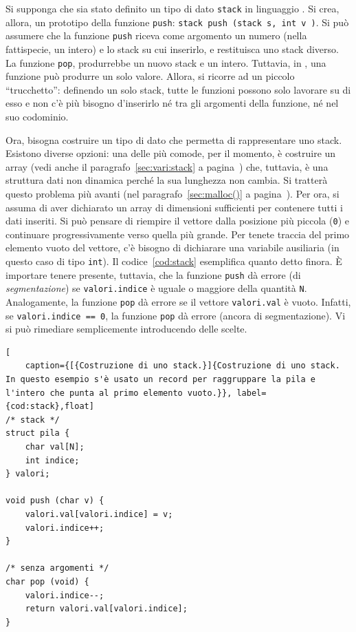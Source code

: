 Si supponga che sia stato definito un tipo di dato \lstinline!stack! in linguaggio .
Si crea, allora, un prototipo della funzione \lstinline!push!: \lstinline!stack push (stack s, int v )!.
Si può assumere che la funzione \lstinline!push! riceva come argomento un numero (nella fattispecie, un intero) e lo stack su cui inserirlo, e restituisca uno stack diverso.
La funzione \lstinline!pop!, produrrebbe un nuovo stack e un intero.
Tuttavia, in , una funzione può produrre un solo valore.
Allora, si ricorre ad un piccolo ``trucchetto'': definendo un solo stack, tutte le funzioni possono solo lavorare su di esso e non c'è più bisogno d'inserirlo né tra gli argomenti della funzione, né nel suo codominio.

Ora, bisogna costruire un tipo di dato che permetta di rappresentare uno stack.
Esistono diverse opzioni: una delle più comode, per il momento, è costruire un array (vedi anche il paragrafo~\ref{sec:vari:stack} a pagina~\pageref{sec:vari:stack}) che, tuttavia, è una struttura dati non dinamica perché la sua lunghezza non cambia.
Si tratterà questo problema più avanti (nel paragrafo~\ref{sec:malloc()} a pagina~\pageref{sec:malloc()}).
Per ora, si assuma di aver dichiarato un array di dimensioni sufficienti per contenere tutti i dati inseriti.
Si può pensare di riempire il vettore dalla posizione più piccola (\lstinline!0!) e continuare progressivamente verso quella più grande.
Per tenete traccia del primo elemento vuoto del vettore, c'è bisogno di dichiarare una variabile ausiliaria (in questo caso di tipo \lstinline!int!).
Il codice~\ref{cod:stack} esemplifica quanto detto finora.
È importare tenere presente, tuttavia, che la funzione \lstinline!push! dà errore (di \emph{segmentazione}) se \lstinline!valori.indice! è uguale o maggiore della quantità \lstinline!N!.
Analogamente, la funzione \lstinline!pop! dà errore se il vettore \lstinline!valori.val! è vuoto.
Infatti, se \lstinline!valori.indice == 0!, la funzione \lstinline!pop! dà errore (ancora di segmentazione).
Vi si può rimediare semplicemente introducendo delle scelte.

\begin{lstlisting}[
	caption={[{Costruzione di uno stack.}]{Costruzione di uno stack. In questo esempio s'è usato un record per raggruppare la pila e l'intero che punta al primo elemento vuoto.}}, label={cod:stack},float]
/* stack */
struct pila {
	char val[N];
	int indice;
} valori;

void push (char v) {
	valori.val[valori.indice] = v;
	valori.indice++;
}

/* senza argomenti */
char pop (void) {
	valori.indice--;
	return valori.val[valori.indice];
}
\end{lstlisting}

